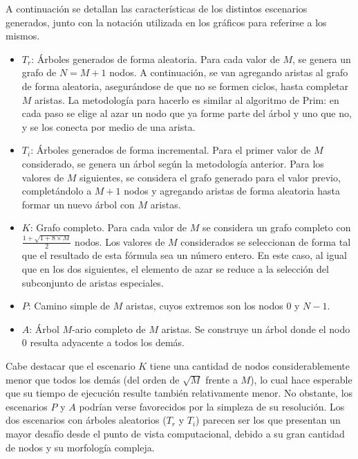     A continuación se detallan las características de los distintos escenarios
    generados, junto con la notación utilizada en los gráficos para referirse
    a los mismos.
    \begin{itemize}
        \item $T_r$: Árboles generados de forma aleatoria. Para cada valor de
        $M$, se genera un grafo de $N = M+1$ nodos. A continuación, se van
        agregando aristas al grafo de forma aleatoria, asegurándose de que no
        se formen ciclos, hasta completar $M$ aristas. La metodología para
        hacerlo es similar al algoritmo de Prim: en cada paso se elige al azar
        un nodo que ya forme parte del árbol y uno que no, y se los conecta
        por medio de una arista.
        \item $T_i$: Árboles generados de forma incremental. Para el primer
        valor de $M$ considerado, se genera un árbol según la metodología
        anterior. Para los valores de $M$ siguientes, se considera el grafo
        generado para el valor previo, completándolo a $M+1$ nodos y agregando
        aristas de forma aleatoria hasta formar un nuevo árbol con $M$
        aristas.
        \item $K$: Grafo completo. Para cada valor de $M$ se considera un
        grafo completo con $\frac{1 + \sqrt{1 + 8 \times M}}{2}$ nodos. Los
        valores de $M$ considerados se seleccionan de forma tal que el
        resultado de esta fórmula sea un número entero. En este caso, al
        igual que en los dos siguientes, el elemento de azar se
        reduce a la selección del subconjunto de aristas especiales.
        \item $P$: Camino simple de $M$ aristas, cuyos extremos son los nodos
        $0$ y $N-1$.
        \item $A$: Árbol $M$-ario completo de $M$ aristas. Se construye un
        árbol donde el nodo $0$ resulta adyacente a todos los demás.
    \end{itemize}

    Cabe destacar que el escenario $K$ tiene una cantidad de nodos
    considerablemente menor que todos los demás (del orden de $\sqrt{M}$
    frente a $M$), lo cual hace esperable que su tiempo de ejecución resulte
    también relativamente menor. No obstante, los escenarios $P$ y $A$
    podrían verse favorecidos por la simpleza de su resolución. Los dos
    escenarios con árboles aleatorios ($T_r$ y $T_i$) parecen ser los que
    presentan un mayor desafío desde el punto de vista computacional, debido a
    su gran cantidad de nodos y su morfología compleja.

